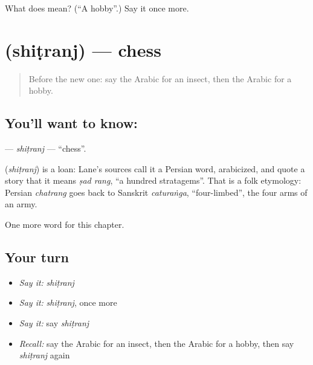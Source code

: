 \begin{tcolorbox}[breakable,colback=teal!4,colframe=teal!35!black,title={Before you move on}]
What does  mean? (\textquotedblleft{}A hobby\textquotedblright{}.) Say it once more.
\end{tcolorbox}
\section[\texorpdfstring{\ar{شطرنج} (shiṭranj)}{شطرنج (shiṭranj)}]{ (shiṭranj) — chess}

\label{lesson:AR-C186-shitranj}



\begin{quote}
Before the new one: say the Arabic for an insect, then the Arabic for a hobby.
\end{quote}

\subsection*{You'll want to know: }
\textbf{} — \emph{shiṭranj} — \textquotedblleft{}chess\textquotedblright{}.

\begin{cousinweb}
\textbf{} (\emph{shiṭranj}) is a loan: Lane's sources call it a Persian word, arabicized, and quote a story that it means \emph{ṣad rang}, \textquotedblleft{}a hundred stratagems\textquotedblright{}. That is a folk etymology: Persian \emph{chatrang} goes back to Sanskrit \emph{caturaṅga}, \textquotedblleft{}four-limbed\textquotedblright{}, the four arms of an army.
\end{cousinweb}

\begin{grammarlens}[title={What you've built}]
One more word for this chapter.
\end{grammarlens}

\subsection*{Your turn}
\begin{itemize}
\raggedright
  \item \emph{Say it:} \emph{shiṭranj}
  \item \emph{Say it:} \emph{shiṭranj}, once more
  \item \emph{Say it:} say \emph{shiṭranj}
  \item \emph{Recall:} say the Arabic for an insect, then the Arabic for a hobby, then say \emph{shiṭranj} again
\end{itemize}

